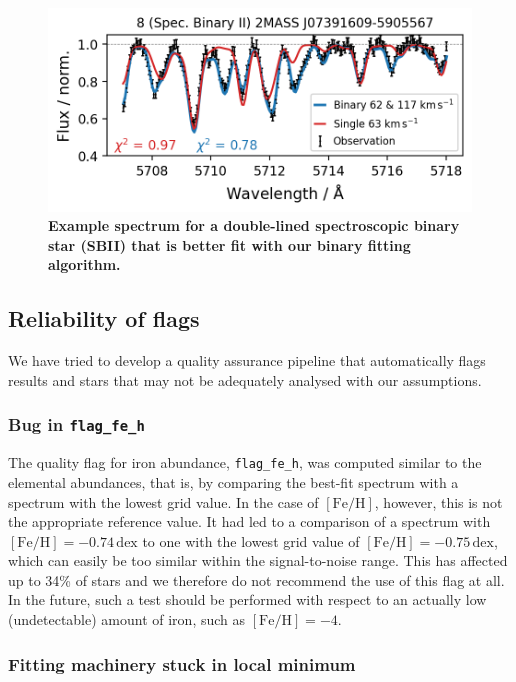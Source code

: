 \documentclass[
  journal=pasa,
  manuscript=research-paper, %
  year=2024,
  volume=37
]{cup-journal}
\newcommand{\feh}{$\mathrm{[Fe/H]}$\xspace}
\begin{document}
\begin{figure}[ht]
 \centering
 \includegraphics[width=\textwidth]{figures/examples_flag_sp_3.png}
 \caption{\textbf{Example spectrum for a double-lined spectroscopic binary star (SBII) that is better fit with our binary fitting algorithm.}} \label{fig:examples_flag_sp_3}
\end{figure}

\subsection{Reliability of flags} \label{sec:caveats_flags}

We have tried to develop a quality assurance pipeline that automatically flags results and stars that may not be adequately analysed with our assumptions.

\subsubsection{Bug in \texttt{flag\_fe\_h}}

The quality flag for iron abundance, \texttt{flag\_fe\_h}, was computed similar to the elemental abundances, that is, by comparing the best-fit spectrum with a spectrum with the lowest grid value. In the case of \feh, however, this is not the appropriate reference value. It had led to a comparison of a spectrum with $\mathrm{[Fe/H]} = -0.74\,\mathrm{dex}$ to one with the lowest grid value of $\mathrm{[Fe/H]} = -0.75\,\mathrm{dex}$, which can easily be too similar within the signal-to-noise range. This has affected up to 34\% of stars and we therefore do not recommend the use of this flag at all. In the future, such a test should be performed with respect to an actually low (undetectable) amount of iron, such as $\mathrm{[Fe/H]} = -4$.

\subsubsection{Fitting machinery stuck in local minimum}
\end{document}
